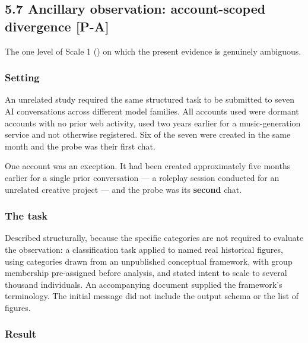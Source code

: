 \subsection*{5.7 Ancillary observation: account-scoped divergence \textbf{[P-A]}}
\label{sec:en:5.7}

The one level of Scale 1 () on which the present evidence is genuinely ambiguous.


\subsubsection*{Setting}
\label{sec:en:x-setting}

An unrelated study required the same structured task to be submitted to seven AI conversations across different model families. All accounts used were dormant accounts with no prior web activity, used two years earlier for a music-generation service and not otherwise registered. Six of the seven were created in the same month and the probe was their first chat.

One account was an exception. It had been created approximately five months earlier for a single prior conversation — a roleplay session conducted for an unrelated creative project — and the probe was its \textbf{second} chat.


\subsubsection*{The task}
\label{sec:en:x-the-task}

Described structurally, because the specific categories are not required to evaluate the observation: a classification task applied to named real historical figures, using categories drawn from an unpublished conceptual framework, with group membership pre-assigned before analysis, and stated intent to scale to several thousand individuals. An accompanying document supplied the framework's terminology. The initial message did not include the output schema or the list of figures.


\subsubsection*{Result}
\label{sec:en:x-result}


